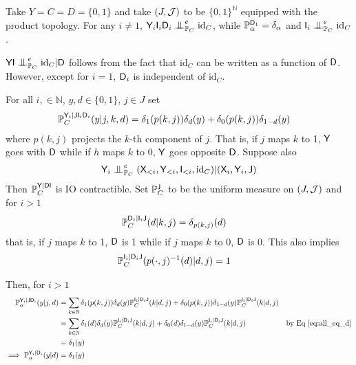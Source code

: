 \begin{example}\label{ex:not_enough_control}
Take $Y=C=D=\{0,1\}$ and take $(J,\mathcal{J})$ to be $\{0,1\}^{\mathbb{N}}$ equipped with the product topology. For any $i\neq 1$, $\RV{Y}_i\RV{I}_i\RV{D}_i\CI^e_{\prob{P}_C} \text{id}_C$, while $\mathbb{P}_\alpha^{\mathsf{D}_1}=\delta_\alpha$ and $\RV{I}_i\CI^e_{\prob{P}_C} \text{id}_C$.

$\RV{YI}\CI^e_{\prob{P}_C} \text{id}_C|\RV{D}$ follows from the fact that $\text{id}_C$ can be written as a function of $\mathsf{D}$. However, except for $i=1$, $\mathsf{D}_i$ is independent of $\text{id}_C$.

For all $i,\in \mathbb{N}$, $y,d\in \{0,1\}$, $j\in J$ set
\begin{align}
    \mathbb{P}_C^{\mathsf{Y}_i|\mathsf{J}\mathsf{I}_i\mathsf{D}_i}(y|j,k,d) &= \delta_1(p(k,j))\delta_d(y) + \delta_0(p(k,j))\delta_{1-d}(y)
\end{align}
where $p(k,j)$ projects the $k$-th component of $j$. That is, if $j$ maps $k$ to 1, $\mathsf{Y}$ goes with $\mathsf{D}$ while if $h$ maps $k$ to $0$, $\mathsf{Y}$ goes opposite $\mathsf{D}$. Suppose also 
\begin{align}
    \RV{Y}_i\CI_{\prob{P}_C}^e (\RV{X}_{<i},\RV{Y}_{<i},\RV{I}_{<i},\text{id}_C)|(\RV{X}_i,\RV{Y}_i,\RV{J})
\end{align}
Then $\mathbb{P}_C^{\mathsf{Y}|\mathsf{DI}}$ is IO contractible. Set $\mathbb{P}_{C}^{\mathsf{J}}$ to be the uniform measure on $(J,\mathcal{J})$ and for $i>1$
\begin{align}
    \mathbb{P}_C^{\mathsf{D}_i|\mathsf{I}_i\mathsf{J}}(d|k,j) &= \delta_{p(k,j)}(d)
\end{align}
that is, if $j$ maps $k$ to 1, $\mathsf{D}$ is 1 while if $j$ maps $k$ to $0$, $\mathsf{D}$ is 0. This also implies
\begin{align}
    \mathbb{P}_C^{\mathsf{I}_i|\mathsf{D}_i\mathsf{J}}(p(\cdot,j)^{-1}(d)|d,j) &= 1\label{eq:all_eq_d}
\end{align}

Then, for $i>1$
\begin{align}
    \mathbb{P}_\alpha^{\mathsf{Y}_i|\mathsf{J}\mathsf{D}_i}(y|j,d) &= \sum_{k\in \mathbb{N}} \delta_1(p(k,j))\delta_d(y)\mathbb{P}_C^{\mathsf{I}_i|\mathsf{D}_i\mathsf{J}}(k|d,j) + \delta_0(p(k,j))\delta_{1-d}(y)\mathbb{P}_C^{\mathsf{I}_i|\mathsf{D}_i\mathsf{J}}(k|d,j)\\
    &= \sum_{k\in \mathbb{N}} \delta_1(d)\delta_d(y)\mathbb{P}_C^{\mathsf{I}_i|\mathsf{D}_i\mathsf{J}}(k|d,j) + \delta_0(d)\delta_{1-d}(y)\mathbb{P}_C^{\mathsf{I}_i|\mathsf{D}_i\mathsf{J}}(k|d,j)&\text{by Eq \eqref{eq:all_eq_d}}\\
    &= \delta_1(y)\\
    \implies \mathbb{P}_\alpha^{\mathsf{Y}_i|\mathsf{D}_i}(y|d) &= \delta_1(y)
\end{align}


\end{example}
